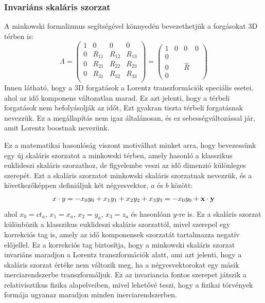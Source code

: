 \documentclass[../main.tex]{subfiles}
\begin{document}
\subsubsection*{Invariáns skaláris szorzat}
A minkowski formalizmus segítségével könnyedén bevezethetjük a forgásokat 3D térben is:
\begin{equation}
    \Lambda =
    \begin{pmatrix}
        1 & 0 & 0 & 0 \\
        0 & R_{11} & R_{12} & R_{13} \\
        0 & R_{21} & R_{22} & R_{23} \\
        0 & R_{31} & R_{32} & R_{33} \\
    \end{pmatrix}
    = 
    \begin{pmatrix}
        1 & 0 & 0 & 0 \\
        0 &  &  &  \\
        0 &  & \hat{R} &  \\
        0 &  &  & 
    \end{pmatrix}
\end{equation}
Innen látható, hogy a 3D forgatások a Lorentz transzformációk speciális esetei, ahol az idő komponens változatlan marad. Ez azt jelenti, hogy a térbeli forgatások nem befolyásolják az időt, Ezt gyakran tiszta térbeli forgatásnak nevezzük.
Ez a megállapítás nem igaz általánosan, és ez sebességváltozással jár, amit Lorentz boostnak nevezünk. 

Ez a matematikai hasonlóság viszont motiválhat minket arra, hogy bevezessünk egy új skaláris szorzatot a minkowski térben, amely hasonló a klasszikus euklideszi skaláris szorzathoz, de figyelembe veszi az idő dimenzió különleges szerepét.
Ezt a skaláris szorzatot minkowski skaláris szorzatnak nevezzük, és a következőképpen definiáljuk két négyesvektor, $a$ és $b$ között:
\begin{equation}
    x \cdot y = -x_0 y_0 + x_1 y_1 + x_2 y_2 + x_3 y_3 = -x_0 y_0 + \bold{x} \cdot \bold{y} 
\end{equation}
ahol $x_0 = ct_a$, $x_1 = x_a$, $x_2 = y_a$, $x_3 = z_a$ és hasonlóan $y$-re is. Ez a skaláris szorzat különbözik a klasszikus euklideszi skaláris szorzattól, mivel szerepel egy korrekciós tag is, amely az idő komponensek szorzatát tartalmazza negatív előjellel.
Ez a korrekciós tag biztosítja, hogy a minkowski skaláris szorzat invariáns maradjon a Lorentz transzformációk alatt, ami azt jelenti, hogy a skaláris szorzat értéke nem változik meg, ha a négyesvektorokat egy másik inerciarendszerbe transzformáljuk.
Ez az invariancia fontos szerepet játszik a relativisztikus fizika alapelveiben, mivel lehetővé teszi, hogy a fizikai törvények formája ugyanaz maradjon minden inerciarendszerben.
\end{document}
